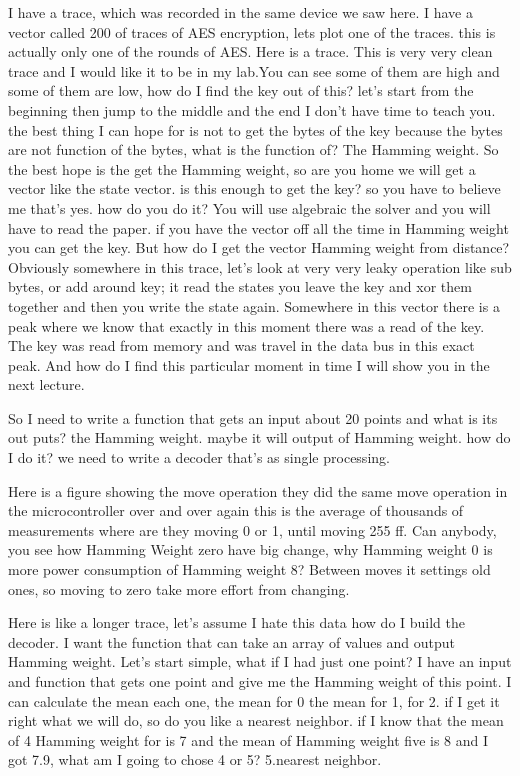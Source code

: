 I have a trace, which was recorded in the same device we saw here. I have a vector called 200 of traces of AES encryption, lets plot one of the traces. this is actually only one of the rounds of AES. Here is a trace. This is very very clean trace and I would like it to be in my lab.You can see some of them are high and some of them are low, how do I find the key out of this? let's start from the beginning then jump to the middle and the end I don't have time to teach you. the best thing I can hope for is not to get the bytes of the key because the bytes are not function of the bytes, what is the function of? The Hamming weight. So the best hope is the get the Hamming weight, so are you home we will get a vector like the state vector. is this enough to get the key? so you have to believe me that's yes. how do you do it? You will use algebraic the solver and you will have to read the paper. if you have the vector off all the time in Hamming weight you can get the key. But how do I get the vector Hamming weight from distance? Obviously somewhere in this trace, let's look at very very leaky operation like sub bytes, or add around key; it read the states you leave the key and xor them together and then you write the state again. Somewhere in this vector there is a peak where we know that exactly in this moment there was a read of the key. The key was read from memory and was travel in the data bus in this exact peak. And how do I find this particular moment in time I will show you in the next lecture.

So I need to write a function that gets an input about 20 points and what is its out puts? the Hamming weight. maybe it will output of Hamming weight. how do I do it? we need to write a decoder that's as single processing.

Here is a figure showing the move operation they did the same move operation in the microcontroller over and over again this is the average of thousands of measurements where are they moving 0 or 1, until moving 255 ff. Can anybody, you see how Hamming Weight zero have big change, why Hamming weight 0 is more power consumption of Hamming weight 8? Between moves it settings old ones, so moving to zero take more effort from changing.
 
Here is like a longer trace, let's assume I hate this data how do I build the decoder. I want the function that can take an array of values and output Hamming weight. 
Let's start simple, what if I had just one point? I have an input and function that gets one point and give me the Hamming weight of this point. I can calculate the mean each one, the mean for 0 the mean for 1, for 2. if I get it right what we will do, so do you like a nearest neighbor. if I know that the mean of 4 Hamming weight for is 7 and the mean of Hamming weight five is 8 and I got 7.9, what am I going to chose 4 or 5? 5.nearest neighbor.

